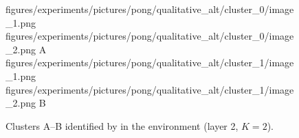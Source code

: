 \begin{figure}[H]
    \qualitativeClusterFigureSetup
    \qualitativeClusterTwo
        {figures/experiments/pictures/pong/qualitative_alt/cluster_0/image_1.png}
        {figures/experiments/pictures/pong/qualitative_alt/cluster_0/image_2.png}
        {A}
    \qualitativeClusterTwo
        {figures/experiments/pictures/pong/qualitative_alt/cluster_1/image_1.png}
        {figures/experiments/pictures/pong/qualitative_alt/cluster_1/image_2.png}
        {B}
    \caption{Clusters A--B identified by  in the \PongName environment (layer 2, $K=2$).}
    \label{fig:qualitative_pong_alt}
\end{figure}
